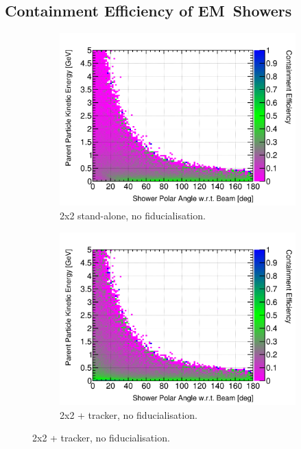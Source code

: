 \documentclass[10pt,a4paper,openany]{article}
\begin{document}
\subsection{Containment Efficiency of EM~Showers}
\begin{figure}[!htb]
	\centering
	\begin{subfigure}[b]{0.49\textwidth}
		\centering
		\includegraphics[width=1.0\textwidth]{EM_cont_eff_2x2.png}
		\caption{2x2 stand-alone, no fiducialisation.}
		\label{}
	\end{subfigure}	
	\hfill
	\begin{subfigure}[b]{0.49\textwidth}
		\centering
		\includegraphics[width=1.0\textwidth]{EM_cont_eff_2x2_Scintillator_gap.png}
		\caption{2x2 + tracker, no fiducialisation.}

\end{subfigure}
\end{figure}
\end{document}
